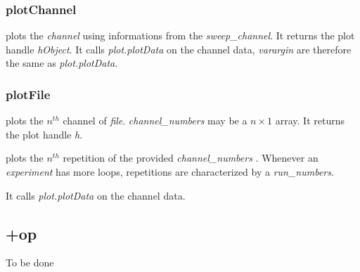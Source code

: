 \subsubsection{plotChannel}
\bdf
{} plots the \emph{channel} using informations from the \emph{sweep\_channel}. It returns the plot handle  \emph{hObject}. It calls \emph{plot.plotData} on the channel data, \emph{varargin} are therefore the same as \emph{plot.plotData}.
\edf


\subsubsection{plotFile}

\bdf
{} plots the $n^{th}$ channel of \emph{file}. \emph{channel\_numbers} may be a $n \times 1$ array. It returns the plot handle \emph{h}.

 plots the $n^{th}$ repetition of the provided \emph{channel\_numbers} . Whenever an \emph{experiment} has more loops, repetitions are characterized by a \emph{run\_numbers}.
\edf

It calls \emph{plot.plotData} on the channel data.

\subsection{+op}

To be done
%

